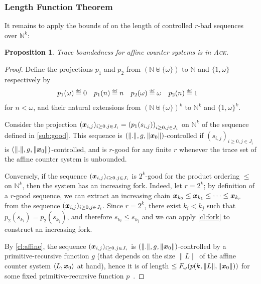 \documentclass[11pt,reqno,a4paper]{amsart}
\newcommand{\eqdef}{\stackrel{\raisebox{-.15ex}{\scalebox{.5}{\upshape\textrm{def}}}}{=}}
\def\vec#1{\mathchoice{\mbox{\boldmath$\displaystyle#1$}}
{\mbox{\boldmath$\textstyle#1$}}
{\mbox{\boldmath$\scriptstyle#1$}}
{\mbox{\boldmath$\scriptscriptstyle#1$}}}
\newcommand{\norm}[1]{\|#1\|}
\newcommand{\tup}[1]{\langle #1\rangle}
\theoremstyle{plain}
\newtheorem{proposition}[theorem]{Proposition}
\theoremstyle{definition}
\theoremstyle{remark}
\renewcommand{\paragraph}{\subsubsection*}
\begin{document}
\paragraph{Length Function Theorem}
It remains to apply the bounds of \citet{dickson} on the length of
controlled $r$-bad sequences over $\mathbb N^k$:
\begin{proposition}
  Trace boundedness for affine counter systems is in \textsc{Ack}.
\end{proposition}
\begin{proof}
  Define the projections $p_1$ and $p_2$ from
  $(\mathbb{N}\uplus\{\omega\})$ to $\mathbb{N}$ and $\{1,\omega\}$
  respectively by 
  \begin{align*}
    p_1(\omega)&\eqdef 0&p_1(n)&\eqdef n&
    p_2(\omega)&\eqdef\omega&p_2(n)&\eqdef 1
  \end{align*}
  for $n<\omega$, and their natural extensions from
  $(\mathbb{N}\uplus\{\omega\})^k$ to $\mathbb{N}^k$ and $\{1,\omega\}^k$.

  Consider the projection $(\vec x_{i,j})_{i\geq 0,j\in
    J_i}=\left(p_1(s_{i,j})\right)_{i\geq 0,j\in J_i}$ on
  $\mathbb{N}^k$ of the sequence defined in \autoref{sub:good}.  This
  sequence is $(\norm{.},g,\norm{\vec x_0})$-controlled if
  $(s_{i,j})_{i\geq 0,j\in J_i}$ is $(\norm{.},g,\norm{\vec
    x_0})$-controlled, and is $r$-good for any finite $r$ whenever the
  trace set of the affine counter system is unbounded.

  Conversely, if the sequence $(\vec x_{i,j})_{i\geq 0,j\in J_i}$ is
  $2^k$-good for the product ordering $\leq$ on $\mathbb{N}^k$, then
  the system has an increasing fork.  Indeed, let $r=2^k$; by
  definition of a $r$-good sequence, we can extract an increasing
  chain $\vec x_{k_0}\leq\vec x_{k_1}\leq\cdots\leq\vec x_{k_r}$ from
  the sequence $(\vec x_{i,j})_{i\geq 0,j\in J_i}$.  Since $r=2^k$, there
  exist $k_i<k_j$ such that $p_2(s_{k_i})=p_2(s_{k_j})$, and therefore
  $s_{k_i}\leq s_{k_j}$ and we can apply \autoref{cl:fork} to
  construct an increasing fork.

  By \autoref{cl:affine}, the sequence $(\vec x_{i,j})_{i\geq 0,j\in
    J_i}$ is $(\norm{.},g,\norm{\vec x_0})$-controlled by a
  primitive-recursive function $g$ (that depends on the size
  $\norm{L}$ of the affine counter system $\tup{L,\vec x_0}$ at hand),
  hence it is of length $\leq F_\omega(p(k,\norm{L},\norm{\vec
    x_0}))$ for some fixed primitive-recursive function
  $p$~\citep{dickson}.
\end{proof}
\end{document}

